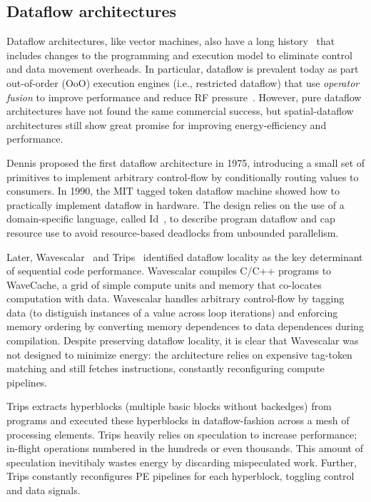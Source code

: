 \subsection{Dataflow architectures}
Dataflow architectures, like vector machines, also have a long history~\cite{dennis1975preliminary,dennis1980data,dennis1988efficient,ttda} that includes changes to the programming and execution model to eliminate control and data movement overheads.
% 
% 
In particular, dataflow is prevalent today as part out-of-order (OoO) execution engines (i.e., restricted
dataflow) that use \emph{operator fusion} to improve performance and reduce RF
pressure~\cite{bracy2004dataflow,sassone2004dynamic,kim2002instruction,sembrant2015long,acsiliouglu2015lazy}.
% 
However, pure dataflow architectures have not found the same commercial success, but spatial-dataflow architectures still show great promise for improving energy-efficiency and performance.

Dennis proposed the first dataflow architecture in 1975, introducing a small set of primitives to implement arbitrary control-flow by conditionally routing values to consumers.
% 
In 1990, the MIT tagged token dataflow machine showed how to practically implement dataflow in hardware.
% 
The design relies on the use of a domain-specific language, called Id~\cite{id-compiler}, to describe program dataflow and cap resource use to avoid resource-based deadlocks from unbounded parallelism.

Later, Wavescalar~\cite{swanson2003wavescalar} and Trips~\cite{trips} identified dataflow locality as the key determinant of sequential code performance.
% 
Wavescalar compiles C/C++ programs to WaveCache, a grid of simple compute units and memory that co-locates computation with data.
% 
Wavescalar handles arbitrary control-flow by tagging data (to distiguish instances of a value across loop iterations) and enforcing memory ordering by  converting memory dependences to data dependences during compilation.
% 
Despite preserving dataflow locality, it is clear that Wavescalar was not designed to minimize energy: the architecture relies on expensive tag-token matching and still fetches instructions, constantly reconfiguring compute pipelines.

Trips extracts hyperblocks (multiple basic blocks without backedges) from programs and executed these hyperblocks in dataflow-fashion across a mesh of processing elements.
% 
Trips heavily relies on speculation to increase performance; in-flight operations numbered in the hundreds or even thousands.
% 
This amount of speculation inevitibaly wastes energy by discarding mispeculated work.
% 
Further, Trips constantly reconfigures PE pipelines for each hyperblock, toggling control and data signals.

